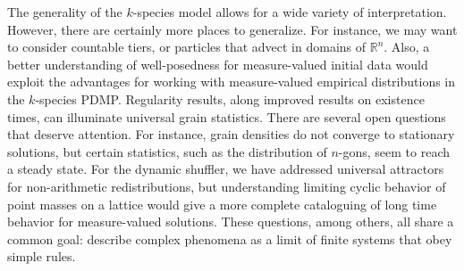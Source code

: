 The generality of the $k$-species model allows for a wide variety of interpretation.  However, there are certainly more places to generalize.  For instance, we may want to consider countable tiers, or particles that advect in domains of $\mathbb R^n$.  Also, a better understanding of well-posedness for measure-valued initial data would exploit the advantages for working with measure-valued empirical distributions in the $k$-species PDMP. Regularity results, along improved results on existence times, can illuminate universal grain statistics.  There are several open questions that deserve attention.  For instance, grain densities do not converge to stationary solutions, but certain statistics, such as the distribution of $n$-gons, seem to reach a steady state. For the dynamic shuffler, we have addressed universal attractors for non-arithmetic redistributions, but understanding limiting cyclic behavior of point masses on a lattice would give a more complete cataloguing of long time behavior for measure-valued solutions.    These questions, among others, all share a common goal:  describe complex phenomena as a  limit of finite systems that obey simple rules.        

    

 

  

       

  
